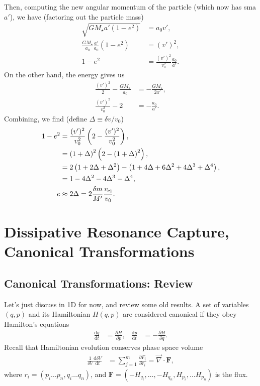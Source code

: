 \documentclass[12pt]{article}
\newcommand*{\rd}[2]{\frac{\mathrm{d}#1}{\mathrm{d}#2}}
\newcommand*{\pd}[2]{\frac{\partial#1}{\partial#2}}
\newcommand*{\bm}[1]{\boldsymbol{\mathbf{#1}}}
\newcommand*{\p}[1]{\left(#1\right)}
\begin{document}
Then, computing the new angular momentum of the particle (which now has sma
$a'$), we have (factoring out the particle mass)
\begin{align}
    \sqrt{GM_\star a'(1 - e^2)} &= a_0v',\\
    \frac{GM_\star}{a_0}\frac{a'}{a_0}(1 - e^2) &= (v')^2,\\
    1 - e^2 &= \frac{(v')^2}{v_0^2}\frac{a_0}{a'}.
\end{align}
On the other hand, the energy gives us
\begin{align}
    \frac{(v')^2}{2} - \frac{GM_\star}{a_0} &= -\frac{GM_\star}{2a'},\\
    \frac{(v')^2}{v_0^2} - 2 &= -\frac{a_0}{a'}.
\end{align}
Combining, we find (define $\Delta \equiv \delta v / v_0$)
\begin{align}
    1 - e^2 &= \frac{(v')^2}{v_0^2}\p{2 - \frac{(v')^2}{v_0^2}},\\
        &= \p{1 + \Delta}^2\p{2 - \p{1 + \Delta}^2},\\
        &= 2\p{1 + 2\Delta + \Delta^2}
            - \p{1 + 4\Delta + 6\Delta^2 + 4\Delta^3 + \Delta^4},\\
        &= 1 - 4\Delta^2 - 4\Delta^3 - \Delta^4,\\
    e &\approx 2\Delta = 2\frac{\delta m}{M'}\frac{v_{\rm ej}}{v_0}.
\end{align}

\section{Dissipative Resonance Capture, Canonical Transformations}

\subsection{Canonical Transformations: Review}

Let's just discuss in 1D for now, and review some old results. A set of
variables $(q, p)$ and its Hamiltonian $H(q, p)$ are considered canonical if
they obey Hamilton's equations
\begin{align}
    \rd{q}{t} &= \pd{H}{p}, &
    \rd{p}{t} &= -\pd{H}{q}.
\end{align}
Recall that Hamiltonian evolution conserves phase space volume
\begin{align}
    \frac{1}{\delta V}\rd{\delta V}{t}
        &= \sum\limits_{j=1}^m \pd{F_i}{r_i} = \vec{\nabla} \cdot \bm{F},
\end{align}
where $r_i = \p{p_i\dots p_n, q_i\dots q_n}$, and $\bm{F} = \p{-H_{q_i},\dots,
-H_{q_n}, H_{p_i},\dots H_{p_n}}$ is the flux.
\end{document}
